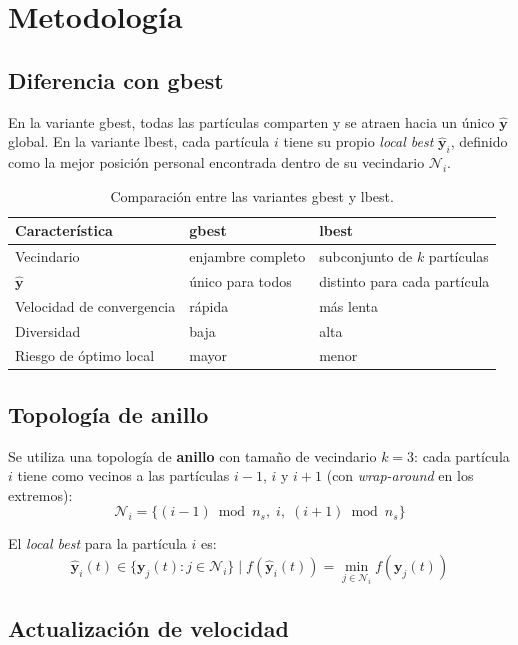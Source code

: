 \documentclass[11pt]{article}
\begin{document}
\section{Metodolog\'ia}

\subsection{Diferencia con gbest}

En la variante gbest, todas las part\'iculas comparten y se atraen hacia un \'unico $\hat{\mathbf{y}}$ global. En la variante lbest, cada part\'icula $i$ tiene su propio \textit{local best} $\hat{\mathbf{y}}_i$, definido como la mejor posici\'on personal encontrada dentro de su vecindario $\mathcal{N}_i$.

\begin{table}[H]
\centering
\begin{tabular}{lll}
\hline\hline
Caracter\'istica & gbest & lbest \\
\hline
Vecindario     & enjambre completo        & subconjunto de $k$ part\'iculas \\
$\hat{\mathbf{y}}$ & \'unico para todos   & distinto para cada part\'icula \\
Velocidad de convergencia & r\'apida         & m\'as lenta \\
Diversidad     & baja                     & alta \\
Riesgo de \'optimo local & mayor            & menor \\
\hline\hline
\end{tabular}
\caption{Comparaci\'on entre las variantes gbest y lbest.}
\end{table}

\subsection{Topolog\'ia de anillo}

Se utiliza una topolog\'ia de \textbf{anillo} con tama\~no de vecindario $k = 3$: cada part\'icula $i$ tiene como vecinos a las part\'iculas $i-1$, $i$ y $i+1$ (con \textit{wrap-around} en los extremos):
\[
\mathcal{N}_i = \{(i-1)\bmod n_s,\; i,\; (i+1)\bmod n_s\}
\]

El \textit{local best} para la part\'icula $i$ es:
\[
\hat{\mathbf{y}}_i(t) \in \{\mathbf{y}_j(t) : j \in \mathcal{N}_i\}
\;\Big|\;
f\!\left(\hat{\mathbf{y}}_i(t)\right) = \min_{j \in \mathcal{N}_i} f\!\left(\mathbf{y}_j(t)\right)
\]

\subsection{Actualizaci\'on de velocidad}
\end{document}
